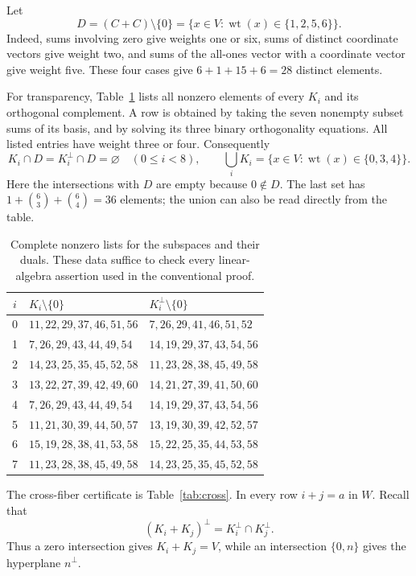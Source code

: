 \documentclass[11pt]{article}
\theoremstyle{definition}\newtheorem{definition}[theorem]{Definition}
\theoremstyle{remark}\newtheorem{remark}[theorem]{Remark}
\newcommand{\wt}{\operatorname{wt}}
\begin{document}
Let
\begin{equation}\label{eq:D}
D=(C+C)\setminus\{0\}
  =\{x\in V:\wt(x)\in\{1,2,5,6\}\}.
\end{equation}
Indeed, sums involving zero give weights one or six, sums of distinct coordinate vectors give weight two, and sums of the all-ones vector with a coordinate vector give weight five. These four cases give $6+1+15+6=28$ distinct elements.

For transparency, Table~\ref{tab:spaces} lists all nonzero elements of every $K_i$ and its orthogonal complement. A row is obtained by taking the seven nonempty subset sums of its basis, and by solving its three binary orthogonality equations. All listed entries have weight three or four. Consequently
\begin{equation}\label{eq:weightfacts}
K_i\cap D=K_i^\perp\cap D=\varnothing\quad(0\leq i<8),
\qquad
\bigcup_i K_i=\{x\in V:\wt(x)\in\{0,3,4\}\}.
\end{equation}
Here the intersections with $D$ are empty because $0\notin D$. The last set has $1+\binom63+\binom64=36$ elements; the union can also be read directly from the table.

\begin{table}[htbp]
\centering\small
\setlength{\tabcolsep}{5pt}
\begin{tabular}{@{}c@{\quad}l@{\quad}l@{}}
\toprule
$i$&$K_i\setminus\{0\}$&$K_i^\perp\setminus\{0\}$\\
\midrule
0&$11,22,29,37,46,51,56$&$7,26,29,41,46,51,52$\\
1&$7,26,29,43,44,49,54$&$14,19,29,37,43,54,56$\\
2&$14,23,25,35,45,52,58$&$11,23,28,38,45,49,58$\\
3&$13,22,27,39,42,49,60$&$14,21,27,39,41,50,60$\\
4&$7,26,29,43,44,49,54$&$14,19,29,37,43,54,56$\\
5&$11,21,30,39,44,50,57$&$13,19,30,39,42,52,57$\\
6&$15,19,28,38,41,53,58$&$15,22,25,35,44,53,58$\\
7&$11,23,28,38,45,49,58$&$14,23,25,35,45,52,58$\\
\bottomrule
\end{tabular}
\caption{Complete nonzero lists for the subspaces and their duals. These data suffice to check every linear-algebra assertion used in the conventional proof.}\label{tab:spaces}
\end{table}

The cross-fiber certificate is Table~\ref{tab:cross}. In every row $i+j=a$ in $W$. Recall that
\[
(K_i+K_j)^\perp=K_i^\perp\cap K_j^\perp.
\]
Thus a zero intersection gives $K_i+K_j=V$, while an intersection $\{0,n\}$ gives the hyperplane $n^\perp$.
\end{document}
